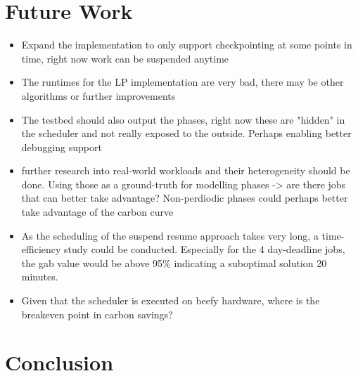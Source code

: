 \section{Future Work} \label{sec:future_work}

\begin{itemize}
    \item Expand the implementation to only support checkpointing at some points in time, right now work can be suspended anytime
    \item The runtimes for the LP implementation are very bad, there may be other algorithms or further improvements
    \item The testbed should also output the phases, right now these are "hidden" in the scheduler and not really exposed to the outside. Perhaps enabling better debugging support
    \item further research into real-world workloads and their heterogeneity should be done. Using those as a ground-truth for modelling phases -> are there jobs that can better take advantage? Non-perdiodic phases could perhaps better take advantage of the carbon curve
    \item As the scheduling of the suspend resume approach takes very long, a time-efficiency study could be conducted. Especially for the 4 day-deadline jobs, the gab value would be above 95\% indicating a suboptimal solution \@ 20 minutes.
    \item Given that the scheduler is executed on beefy hardware, where is the breakeven point in carbon savings?
\end{itemize}

\section{Conclusion} \label{sec:conclusion}
